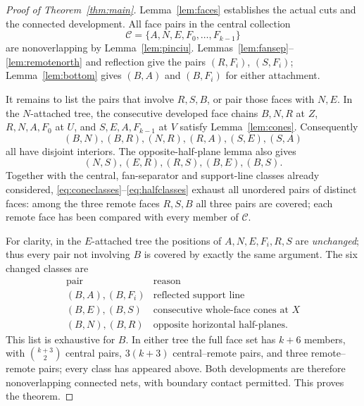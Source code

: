 \documentclass[11pt]{amsart}
\begin{document}
\begin{proof}[Proof of Theorem~\ref{thm:main}]
Lemma~\ref{lem:faces} establishes the actual cuts and the connected development. All face pairs in the central collection
\[
 \mathcal C=\{A,N,E,F_0,\ldots,F_{k-1}\}
\]
are nonoverlapping by Lemma~\ref{lem:pinciu}. Lemmas~\ref{lem:fansep}--\ref{lem:remotenorth} and reflection give the pairs \((R,F_i)\), \((S,F_i)\); Lemma~\ref{lem:bottom} gives \((B,A)\) and \((B,F_i)\) for either attachment.

It remains to list the pairs that involve \(R,S,B\), or pair those faces with \(N,E\). In the \(N\)-attached tree, the consecutive developed face chains \(B,N,R\) at \(Z\), \(R,N,A,F_0\) at \(U\), and \(S,E,A,F_{k-1}\) at \(V\) satisfy Lemma~\ref{lem:cones}. Consequently
\begin{equation}\label{eq:coneclasses}
 (B,N),(B,R),(N,R),(R,A),(S,E),(S,A)
\end{equation}
all have disjoint interiors. The opposite-half-plane lemma also gives
\begin{equation}\label{eq:halfclasses}
 (N,S),(E,R),(R,S),(B,E),(B,S).
\end{equation}
Together with the central, fan-separator and support-line classes already considered, \eqref{eq:coneclasses}--\eqref{eq:halfclasses} exhaust all unordered pairs of distinct faces: among the three remote faces \(R,S,B\) all three pairs are covered; each remote face has been compared with every member of \(\mathcal C\).

For clarity, in the \(E\)-attached tree the positions of \(A,N,E,F_i,R,S\) are \emph{unchanged}; thus every pair not involving \(B\) is covered by exactly the same argument. The six changed classes are
\[
 \begin{array}{c|c}
 \text{pair}&\text{reason}\\ \hline
 (B,A),(B,F_i)&\text{reflected support line}\\
 (B,E),(B,S)&\text{consecutive whole-face cones at }X\\
 (B,N),(B,R)&\text{opposite horizontal half-planes}.
 \end{array}
\]
This list is exhaustive for \(B\). In either tree the full face set has \(k+6\) members, with \(\binom{k+3}{2}\) central pairs, \(3(k+3)\) central--remote pairs, and three remote--remote pairs; every class has appeared above. Both developments are therefore nonoverlapping connected nets, with boundary contact permitted. This proves the theorem.
\end{proof}
\end{document}
